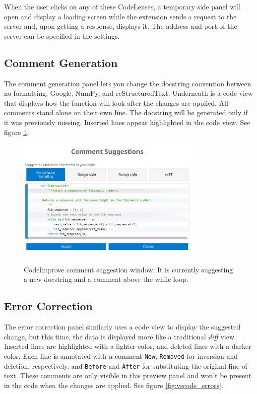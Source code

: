         When the user clicks on any of these CodeLenses, a temporary side panel will open and display a loading screen while the extension sends a request to the server and, upon getting a response, displays it. The address and port of the server can be specified in the settings.
        
        \subsection{Comment Generation}
            The comment generation panel lets you change the docstring convention between no formatting, Google, NumPy, and reStructuredText. Underneath is a code view that displays how the function will look after the changes are applied. All comments stand alone on their own line. The docstring will be generated only if it was previously missing. Inserted lines appear highlighted in the code view. See figure \ref{fig:vscode_comments}.
        
        \begin{figure}[ht!]
          \centering
          \includegraphics[width=0.8\textwidth]{obrazky-figures/CodeImprove-comment-screenshot.png}
          \caption{CodeImprove comment suggestion window. It is currently suggesting a new docstring and a comment above the while loop.}
          \label{fig:vscode_comments}
        \end{figure}
        
        \subsection{Error Correction}
            The error correction panel similarly uses a code view to display the suggested change, but this time, the data is displayed more like a traditional \emph{diff} view. Inserted lines are highlighted with a lighter color, and deleted lines with a darker color. Each line is annotated with a comment \texttt{New}, \texttt{Removed} for inversion and deletion, respectively, and \texttt{Before} and \texttt{After} for substituting the original line of text. These comments are only visible in this preview panel and won't be present in the code when the changes are applied. See figure \ref{fig:vscode_errors}.
        

